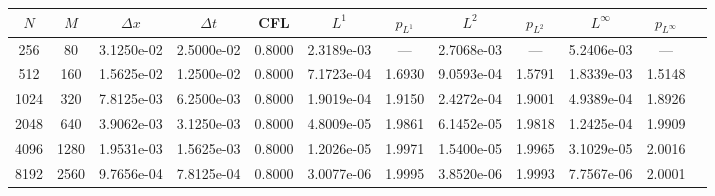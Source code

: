 \begin{tabular}{cccccccccccc}
\toprule
$N$ & $M$ & $\Delta x$ & $\Delta t$ & CFL & $L^1$ & $p_{L^1}$ & $L^2$ & $p_{L^2}$ & $L^\infty$ & $p_{L^\infty}$ \\
\midrule
256 & 80 & 3.1250e-02 & 2.5000e-02 & 0.8000 & 2.3189e-03 & --- & 2.7068e-03 & --- & 5.2406e-03 & --- \\
512 & 160 & 1.5625e-02 & 1.2500e-02 & 0.8000 & 7.1723e-04 & 1.6930 & 9.0593e-04 & 1.5791 & 1.8339e-03 & 1.5148 \\
1024 & 320 & 7.8125e-03 & 6.2500e-03 & 0.8000 & 1.9019e-04 & 1.9150 & 2.4272e-04 & 1.9001 & 4.9389e-04 & 1.8926 \\
2048 & 640 & 3.9062e-03 & 3.1250e-03 & 0.8000 & 4.8009e-05 & 1.9861 & 6.1452e-05 & 1.9818 & 1.2425e-04 & 1.9909 \\
4096 & 1280 & 1.9531e-03 & 1.5625e-03 & 0.8000 & 1.2026e-05 & 1.9971 & 1.5400e-05 & 1.9965 & 3.1029e-05 & 2.0016 \\
8192 & 2560 & 9.7656e-04 & 7.8125e-04 & 0.8000 & 3.0077e-06 & 1.9995 & 3.8520e-06 & 1.9993 & 7.7567e-06 & 2.0001 \\
\bottomrule
\end{tabular}